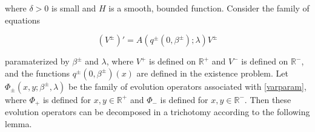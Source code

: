 \documentclass[12pt]{article}
\def\R{{\mathbb R}}
\begin{document}
where $\delta > 0$ is small and $H$ is a smooth, bounded function. Consider the family of equations

\begin{equation}\label{varparam}
(V^\pm)' = A(q^\pm(0, \beta^\pm); \lambda) V^\pm
\end{equation}

paramaterized by $\beta^\pm$ and $\lambda$, where $V^+$ is defined on $\R^+$ and $V^-$ is defined on $\R^-$, and the functions $q^\pm(0, \beta^\pm)(x)$ are defined in the existence problem. Let $\Phi_\pm(x, y; \beta^\pm, \lambda)$ be the family of evolution operators associated with \eqref{varparam}, where $\Phi_+$ is defined for $x, y \in \R^+$ and $\Phi_-$ is defined for $x, y \in \R^-$. Then these evolution operators can be decomposed in a trichotomy according to the following lemma.

\end{document}

